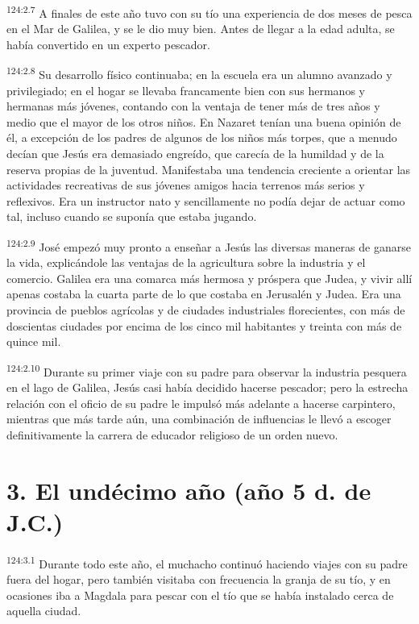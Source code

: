 \par 
\textsuperscript{124:2.7} A finales de este año tuvo con su tío una experiencia de dos meses de pesca en el Mar de Galilea, y se le dio muy bien. Antes de llegar a la edad adulta, se había convertido en un experto pescador.

\par 
\textsuperscript{124:2.8} Su desarrollo físico continuaba; en la escuela era un alumno avanzado y privilegiado; en el hogar se llevaba francamente bien con sus hermanos y hermanas más jóvenes, contando con la ventaja de tener más de tres años y medio que el mayor de los otros niños. En Nazaret tenían una buena opinión de él, a excepción de los padres de algunos de los niños más torpes, que a menudo decían que Jesús era demasiado engreído, que carecía de la humildad y de la reserva propias de la juventud. Manifestaba una tendencia creciente a orientar las actividades recreativas de sus jóvenes amigos hacia terrenos más serios y reflexivos. Era un instructor nato y sencillamente no podía dejar de actuar como tal, incluso cuando se suponía que estaba jugando.

\par 
\textsuperscript{124:2.9} José empezó muy pronto a enseñar a Jesús las diversas maneras de ganarse la vida, explicándole las ventajas de la agricultura sobre la industria y el comercio. Galilea era una comarca más hermosa y próspera que Judea, y vivir allí apenas costaba la cuarta parte de lo que costaba en Jerusalén y Judea. Era una provincia de pueblos agrícolas y de ciudades industriales florecientes, con más de doscientas ciudades por encima de los cinco mil habitantes y treinta con más de quince mil.

\par 
\textsuperscript{124:2.10} Durante su primer viaje con su padre para observar la industria pesquera en el lago de Galilea, Jesús casi había decidido hacerse pescador; pero la estrecha relación con el oficio de su padre le impulsó más adelante a hacerse carpintero, mientras que más tarde aún, una combinación de influencias le llevó a escoger definitivamente la carrera de educador religioso de un orden nuevo.

\section*{3. El undécimo año (año 5 d. de J.C.)}
\par 
\textsuperscript{124:3.1} Durante todo este año, el muchacho continuó haciendo viajes con su padre fuera del hogar, pero también visitaba con frecuencia la granja de su tío, y en ocasiones iba a Magdala para pescar con el tío que se había instalado cerca de aquella ciudad.

